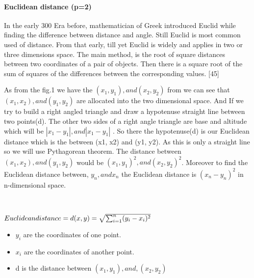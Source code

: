 \documentclass[conference]{IEEEtran}
\begin{document}
\paragraph{\textbf{Euclidean distance (p=2)}}
In the early 300 Era before, mathematician of Greek introduced Euclid while finding the difference between distance and angle. Still Euclid is most common used of distance. From that early, till yet Euclid is widely and applies in two or three dimensions space. The main method, is the root of square distances between two coordinates of a pair of objects. Then there is a square root of the sum of squares of the differences between the corresponding values. [45]

As from the fig.1 we have the 
\begin{math}
(x_1,y_1), and (x_2,y_2)
\end{math}
from we can see that 
\begin{math}
(x_1,x_2), and (y_1,y_2)
\end{math}
are allocated into the two dimensional space. And If we try to build a right angled triangle and draw a hypotenuse straight line between two points(d). The other two sides of a right angle triangle are base and altitude which will be
\begin{math}
|x_1 - y_1|, and |x_1 - y_1|
\end{math}
. So there the hypotenuse(d) is our Euclidean distance which is the between (x1, x2) and (y1, y2). As this is only a straight line so we will use Pythagorean theorem. The distance between 
\begin{math}
(x_1,x_2), and (y_1,y_2)
\end{math}
would be \begin{math}
(x_1,y_1)^2, and (x_2,y_2)^2
\end{math}.
Moreover to find the Euclidean distance between,
\begin{math}
y_n ,  and x_n
\end{math}
the Euclidean distance is
\begin{math}
(x_n - y_n)^2
\end{math} in n-dimensional space. 

\


\begin{math}
Euclidean distance = d(x,y)=\sqrt{\sum_{i=1}^{n} (y_{i} - x_{i})^2}
\newline
\end{math}

\begin{itemize}
    \item \begin{math}
y_{i}
\end{math}
are the coordinates of one point.
\item \begin{math}
x_{i}
\end{math}
are the coordinates of another point.

\item 
d is the distance between
\begin{math}
(x_{1},y_{1}), and, (x_{2},y_{2})
\end{math}

\end{itemize}
\end{document}
